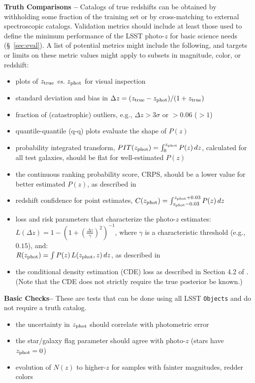 \documentclass[DM,authoryear,toc]{lsstdoc}
\begin{document}
\begin{enumerate}
{\bf Truth Comparisons --} 
Catalogs of true redshifts can be obtained by withholding some fraction of the training set or by cross-matching to external spectroscopic catalogs. Validation metrics should include at least those used to define the minimum performance of the LSST photo-$z$ for basic science needs (\S~\ref{sec:eval}). A list of potential metrics might include the following, and targets or limits on these metric values might apply to subsets in magnitude, color, or redshift: 
\vspace{-15pt}
\begin{itemize}
\item plots of $z_{\rm true}$ {\it vs.} $z_{\rm phot}$ for visual inspection
\item standard deviation and bias in $\Delta z = (z_{\rm true}-z_{\rm phot})/(1+z_{\rm true})$
\item fraction of (catastrophic) outliers, e.g., $\Delta z > 3\sigma$ or $>0.06$ ($>1$)
\item quantile-quantile (q-q) plots evaluate the shape of $P(z)$
\item probability integrated transform, $PIT(z_{\rm phot}) = \int_{0}^{z_{\rm phot}} P(z)\,dz$, calculated for all test galaxies, should be flat for well-estimated $P(z)$ \citep{2016arXiv160808016P}
\item the continuous ranking probability score, CRPS, should be a lower value for better estimated $P(z)$, as described in \citep{2016arXiv160808016P}
\item redshift confidence for point estimates, $C(z_{\rm phot}) = \int_{z_{\rm phot}-0.03}^{z_{\rm phot}+0.03} P(z)\,dz $
\item loss and risk parameters that characterize the photo-$z$ estimates:\\
$L(\Delta z) = 1 - \left(1+ \left(\frac{\Delta z}{\gamma} \right)^2 \right)^{-1}$, 
where $\gamma$ is a characteristic threshold (e.g., $0.15$), and:\\
$R(z_{\rm phot}) = \int P(z)\,L(z_{\rm phot},z)\,dz$, as described in \citet{2018PASJ...70S...9T}
\item the conditional density estimation (CDE) loss as described in Section 4.2 of \citet{2020MNRAS.499.1587S}. (Note that the CDE does not strictly require the true posterior be known.)
\end{itemize}

{\bf Basic Checks--} 
These are tests that can be done using all LSST {\tt Objects} and do not require a truth catalog.
\vspace{-15pt}
\begin{itemize}
\item the uncertainty in $z_{\rm phot}$ should correlate with photometric error
\item the star/galaxy flag parameter should agree with photo-$z$ (stars have $z_{\rm phot}=0$)
\item evolution of $N(z)$ to higher-$z$ for samples with fainter magnitudes, redder colors
\end{itemize}


\end{enumerate}
\end{document}

